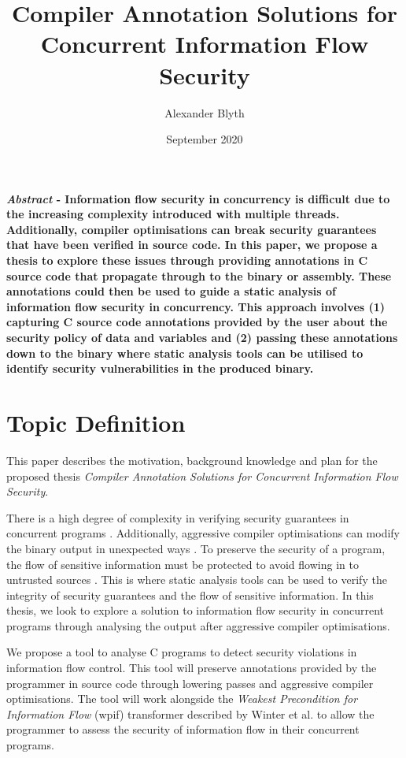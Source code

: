 \documentclass[twocolumn]{article}
\title{Compiler Annotation Solutions for Concurrent Information Flow Security}
\author{Alexander Blyth}
\date{September 2020}
\begin{document}
\maketitle


\textbf{\textit{Abstract} - Information flow security in concurrency is difficult due to the increasing complexity introduced with multiple threads. Additionally, compiler optimisations can break security guarantees that have been verified in source code. In this paper, we propose a thesis to explore these issues through providing annotations in C source code that propagate through to the binary or assembly. These annotations could then be used to guide a static analysis of information flow security in concurrency. This approach involves (1) capturing C source code annotations provided by the user about the security policy of data and variables and (2) passing these annotations down to the binary where static analysis tools can be utilised to identify security vulnerabilities in the produced binary. }

\section{Topic Definition}
This paper describes the motivation, background knowledge and plan for the proposed thesis \textit{Compiler Annotation Solutions for Concurrent Information Flow Security}.

There is a high degree of complexity in verifying security guarantees in concurrent programs \cite{TODO}. Additionally, aggressive compiler optimisations can modify the binary output in unexpected ways \cite{d2015correctness}. To preserve the security of a program, the flow of sensitive information must be protected to avoid flowing in to untrusted sources \cite{balliu2014logics}. This is where static analysis tools can be used to verify the integrity of security guarantees and the flow of sensitive information. In this thesis, we look to explore a solution to information flow security in concurrent programs through analysing the output after aggressive compiler optimisations.

We propose a tool to analyse C programs to detect security violations in information flow control. This tool will preserve annotations provided by the programmer in source code through lowering passes and aggressive compiler optimisations. The tool will work alongside the \textit{Weakest Precondition for Information Flow} (wpif) transformer described by Winter et al. \cite{winter2020information} to allow the programmer to assess the security of information flow in their concurrent programs.
\end{document}
